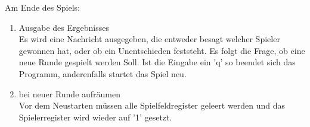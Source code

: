 Am Ende des Spiels:
\begin{enumerate}
 \item Ausgabe des Ergebnisses\\
 Es wird eine Nachricht ausgegeben, die entweder besagt welcher Spieler
gewonnen 
 hat, oder ob ein Unentschieden feststeht. Es folgt die Frage, ob eine neue
Runde gespielt werden Soll. Ist die Eingabe ein 'q' so beendet sich das
Programm, anderenfalls startet das Spiel neu.
 \item bei neuer Runde aufräumen\\
 Vor dem Neustarten müssen alle Spielfeldregister geleert werden und das 
 Spielerregister wird wieder auf '1' gesetzt.
\end{enumerate}











